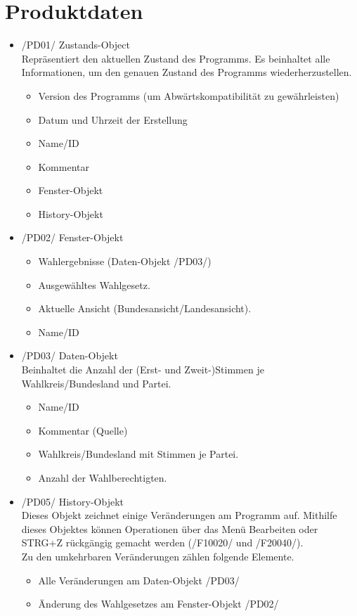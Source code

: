 \documentclass[10pt,a4paper]{article}
\begin{document}
\section{Produktdaten}
\begin{itemize}
	\item /PD01/ Zustands-Object \hfill \\
	Repräsentiert den aktuellen Zustand des Programms. Es beinhaltet alle Informationen, um den genauen Zustand des Programms wiederherzustellen.
	\begin{itemize}
		\item Version des Programms (um Abwärtskompatibilität zu gewährleisten)
		\item Datum und Uhrzeit der Erstellung
		\item Name/ID
		\item Kommentar
		\item Fenster-Objekt
		\item History-Objekt
	\end{itemize}
	
	\item /PD02/ Fenster-Objekt
	\begin{itemize}
		\item Wahlergebnisse (Daten-Objekt /PD03/)
		\item Ausgewähltes Wahlgesetz.
		\item Aktuelle Ansicht (Bundesansicht/Landesansicht).
		\item Name/ID
	\end{itemize}
	
	\item /PD03/ Daten-Objekt \hfill \\
	Beinhaltet die Anzahl der (Erst- und Zweit-)Stimmen je Wahlkreis/Bundesland und Partei.
	\begin{itemize}
		\item Name/ID
		\item Kommentar (Quelle)
		\item Wahlkreis/Bundesland mit Stimmen je Partei.
		\item Anzahl der Wahlberechtigten.
	\end{itemize}
	
	\item /PD05/ History-Objekt \hfill \\
	Dieses Objekt zeichnet einige Veränderungen am Programm auf. Mithilfe dieses Objektes können Operationen über das Menü Bearbeiten oder STRG+Z rückgängig gemacht werden (/F10020/ und /F20040/). \\
	Zu den umkehrbaren Veränderungen zählen folgende Elemente.
	\begin{itemize}
		\item Alle Veränderungen am Daten-Objekt /PD03/
		\item Änderung des Wahlgesetzes am Fenster-Objekt /PD02/
	\end{itemize}
\end{itemize}
\end{document}

